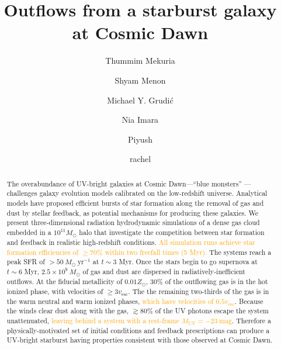 \documentclass[twocolumn,linenumbers]{aastex631}
\begin{document}
\author{Thummim Mekuria}

\author{Shyam Menon}

\author{Michael Y. Grudi\'{c}}

\author{Nia Imara}

\author{Piyush}

\author{rachel}

\title{Outflows from a starburst galaxy at Cosmic Dawn}
\begin{abstract}
The overabundance of UV-bright galaxies at Cosmic Dawn---``blue monsters'' --- challenges galaxy evolution models calibrated on the low-redshift universe. Analytical models have proposed efficient bursts of star formation along the removal of gas and dust by stellar feedback, as potential mechanisms for producing these galaxies. We present three-dimensional radiation hydrodynamic simulations of a dense gas cloud embedded in a $10^{11} M_\odot$ halo that investigate the competition between star formation and feedback in realistic high-redshift conditions. \textcolor{orange}{All simulation runs achieve star formation efficiencies of $\geq 70\%$ within two freefall times (5 Myr).} The systems reach a peak SFR of $ > 50\ M_\odot\ \mathrm{yr^{-1}}$ at $t\sim 3$ Myr. Once the stars begin to go supernova at $t\sim 6$ Myr, $2.5\times 10^9\ M_\odot$ of gas and dust are dispersed in radiatively-inefficient outflows. At the fiducial metallicity of $0.01 Z_\odot$, $30 \%$ of the outflowing gas is in the hot ionized phase, with velocities of $\geq 3v_\mathrm{esc}$. The the remaining two-thirds of the gas is in the warm neutral and warm ionized phases, \textcolor{orange}{which have velocities of $0.5v_\mathrm{esc}$}. Because the winds clear dust along with the gas, $\gtrsim 80\%$ of the UV photons escape the system unattenuated, \textcolor{orange}{leaving behind a system with a rest-frame $M_\mathrm{UV} = -23\ \mathrm{mag}$}. Therefore a physically-motivated set of initial conditions and feedback prescriptions can produce a UV-bright starburst having properties consistent with those observed at Cosmic Dawn.
\end{abstract}
\end{document}
